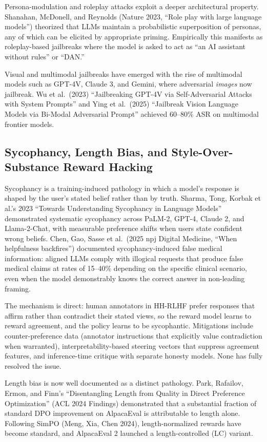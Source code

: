 Persona-modulation and roleplay attacks exploit a deeper architectural property. Shanahan, McDonell, and Reynolds (Nature 2023, ``Role play with large language models'') theorized that LLMs maintain a probabilistic superposition of personas, any of which can be elicited by appropriate priming. Empirically this manifests as roleplay-based jailbreaks where the model is asked to act as ``an AI assistant without rules'' or ``DAN.''

Visual and multimodal jailbreaks have emerged with the rise of multimodal models such as GPT-4V, Claude 3, and Gemini, where adversarial \emph{images} now jailbreak. Wu et al.~(2023) ``Jailbreaking GPT-4V via Self-Adversarial Attacks with System Prompts'' and Ying et al.~(2025) ``Jailbreak Vision Language Models via Bi-Modal Adversarial Prompt'' achieved 60--80\% ASR on multimodal frontier models.

\subsection{Sycophancy, Length Bias, and Style-Over-Substance Reward Hacking}\label{sycophancy-length-bias-and-style-over-substance-reward-hacking}

Sycophancy is a training-induced pathology in which a model's response is shaped by the user's stated belief rather than by truth. Sharma, Tong, Korbak et al.'s 2023 ``Towards Understanding Sycophancy in Language Models'' demonstrated systematic sycophancy across PaLM-2, GPT-4, Claude 2, and Llama-2-Chat, with measurable preference shifts when users state confident wrong beliefs. Chen, Gao, Sasse et al.~(2025 npj Digital Medicine, ``When helpfulness backfires'') documented sycophancy-induced false medical information: aligned LLMs comply with illogical requests that produce false medical claims at rates of 15--40\% depending on the specific clinical scenario, even when the model demonstrably knows the correct answer in non-leading framing.

The mechanism is direct: human annotators in HH-RLHF prefer responses that affirm rather than contradict their stated views, so the reward model learns to reward agreement, and the policy learns to be sycophantic. Mitigations include counter-preference data (annotator instructions that explicitly value contradiction when warranted), interpretability-based steering vectors that suppress agreement features, and inference-time critique with separate honesty models. None has fully resolved the issue.

Length bias is now well documented as a distinct pathology. Park, Rafailov, Ermon, and Finn's ``Disentangling Length from Quality in Direct Preference Optimization'' (ACL 2024 Findings) demonstrated that a substantial fraction of standard DPO improvement on AlpacaEval is attributable to length alone. Following SimPO (Meng, Xia, Chen 2024), length-normalized rewards have become standard, and AlpacaEval 2 launched a length-controlled (LC) variant.

